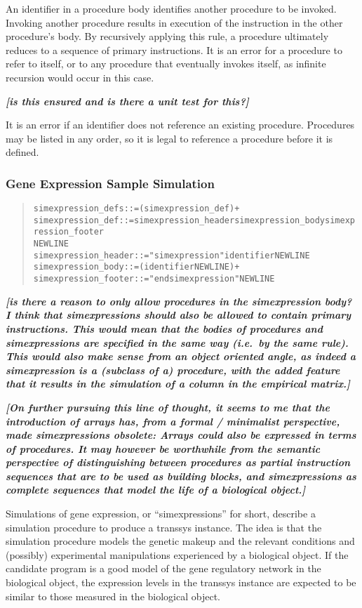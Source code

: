 \documentclass[a4paper,fleqn]{article}
\newcommand{\todo}[1]{\rule{0pt}{0pt}\marginpar{\rule{1ex}{1ex}}\textbf{\emph{[#1]}}}
\newenvironment{ebnfrule}{\begin{footnotesize}\begin{quote}\begin{alltt}}{\end{alltt}\end{quote}\end{footnotesize}}
\begin{document}
An identifier in a procedure body identifies another procedure to be
invoked. Invoking another procedure results in execution of the
instruction in the other procedure's body. By recursively applying
this rule, a procedure ultimately reduces to a sequence of primary
instructions.  It is an error for a procedure to refer to itself, or
to any procedure that eventually invokes itself, as infinite recursion
would occur in this case. \todo{is this ensured and is there a unit
  test for this?}

It is an error if an identifier does not reference an existing
procedure. Procedures may be listed in any order, so it is legal to
reference a procedure before it is defined.


\subsubsection{Gene Expression Sample Simulation}

\begin{ebnfrule}
simexpression_defs ::= (simexpression_def)+
simexpression_def ::= simexpression_header simexpression_body simexpression_footer 
NEWLINE
simexpression_header ::= "simexpression" identifier NEWLINE
simexpression_body ::= (identifier NEWLINE)+
simexpression_footer ::= "endsimexpression" NEWLINE
\end{ebnfrule}

\todo{is there a reason to only allow procedures in the simexpression
  body? I think that simexpressions should also be allowed to contain
  primary instructions. This would mean that the bodies of procedures
  and simexpressions are specified in the same way (i.e.\ by the same
  rule). This would also make sense from an object oriented angle, as
  indeed a simexpression \emph{is a} (subclass of a) procedure, with
  the added feature that it results in the simulation of a column in
  the empirical matrix.}

\todo{On further pursuing this line of thought, it seems to me that
  the introduction of arrays has, from a formal / minimalist
  perspective, made simexpressions obsolete: Arrays could also be
  expressed in terms of procedures. It may however be worthwhile from
  the semantic perspective of distinguishing between procedures as
  partial instruction sequences that are to be used as building
  blocks, and simexpressions as complete sequences that model the life
  of a biological object.}

Simulations of gene expression, or ``simexpressions'' for short,
describe a simulation procedure to produce a transsys instance. The
idea is that the simulation procedure models the genetic makeup and
the relevant conditions and (possibly) experimental manipulations
experienced by a biological object. If the candidate program is a good
model of the gene regulatory network in the biological object, the
expression levels in the transsys instance are expected to be similar
to those measured in the biological object.
\end{document}
